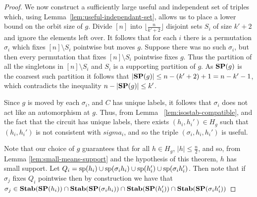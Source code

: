 \documentclass[../paper.tex]{subfiles}
\begin{document}
\begin{proof}
  We now construct a sufficiently large useful and independent set of triples
  which, using Lemma~\ref{lem:useful-independant-set}, allows us to place a
  lower bound on the orbit size of $g$. Divide $[n]$ into $\lfloor \frac{n}{k' +
    2} \rfloor$ disjoint sets $S_i$ of size $k' + 2$ and ignore the elements
  left over. It follows that for each $i$ there is a permutation $\sigma_i$
  which fixes $[n] \setminus S_i$ pointwise but moves $g$. Suppose there was no
  such $\sigma_i$, but then every permutation that fixes $[n]\setminus S_i$
  pointwise fixes $g$. Thus the partition of all the singletons in $[n]\setminus
  S_i$ and $S_i$ is a supporting partition of $g$. As $\text{\textbf{SP}}(g)$ is the coarsest
  such partition it follows that $\vert \text{\textbf{SP}}(g) \vert \leq n - (k'+2) + 1 = n -
  k' - 1$, which contradicts the inequality $n - \vert \text{\textbf{SP}}(g) \vert \leq k'$.

  Since $g$ is moved by each $\sigma_i$, and $C$ has unique labels, it follows
  that $\sigma_i$ does not act like an automorphism at $g$. Thus, from Lemma
~\ref{lem:isostab-compatible}, and the fact that the circuit has unique labels,
  there exists $(h_i, h_i') \in H_g$ such that $(h_i, h_i')$ is not consistent
  with $sigma_i$, and so the triple $(\sigma_i, h_i, h_i')$ is useful.

  Note that our choice of $g$ guarantees that for all $h \in H_g$, $\vert h
  \vert \leq \frac{n}{2}$, and so, from Lemma \ref{lem:small-means-support} and
  the hypothesis of this theorem, $h$ has small support. Let $Q_i = \text{sp}(h_i)
  \cup \text{sp}(\sigma_i h_i) \cup \text{sp}(h_i') \cup \text{sp}(\sigma_i h_i')$. Then
  note that if $\sigma_j$ fixes $Q_i$ pointwise then by construction we have
  that $\sigma_j \in \text{\textbf{Stab}}(\text{\textbf{SP}}(h_i)) \cap \text{\textbf{Stab}}(\text{\textbf{SP}}(\sigma_i h_i)) \cap
  \text{\textbf{Stab}}(\text{\textbf{SP}}(h_i')) \cap \text{\textbf{Stab}}(\text{\textbf{SP}}(\sigma_i h_i'))$


\end{proof}
\end{document}
